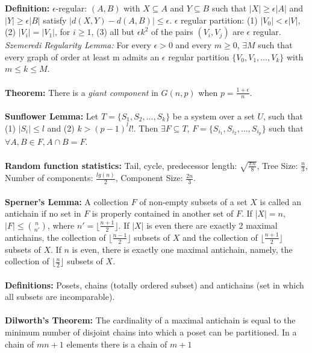 {\bf Definition:}
$\epsilon$-regular: $(A,B)$ with $X \subseteq A$ and $Y \subseteq B$ such that
$|X| \geq \epsilon |A|$ and
$|Y| \geq \epsilon |B|$ satisfy $|d(X,Y)-d(A,B)| \leq \epsilon$.
$\epsilon$ regular partition: (1) $| V_0 | < \epsilon |V|$, (2) $|V_i | = |
V_1 |$,
for $i \geq 1$, (3) all but $\epsilon k^2$ of the pairs $(V_i , V_j )$ are
$\epsilon$ regular.
\emph{Szemeredi Regularity Lemma:} For every $\epsilon >0$ and every $m \geq 0$,
$\exists M$ such that every graph of order at least m admits an $\epsilon$
regular partition $\{ V_0 , V_1 , \ldots , V_k \}$ with $m \leq k \leq M$.
\\
\\
{\bf Theorem:} There is a \emph{giant component} in $G(n,p)$ 
when $p={\frac {1+ \epsilon } {n}}$.\\
\\
{\bf Sunflower Lemma:} Let $T= \{ S_1 , S_2 , \ldots , S_k \}$ be a system over a
set $U$, such that (1) $| S_i | \leq l$ and (2) $k> {(p-1)}^l l!$.  Then
$\exists F \subseteq T$, $F= \{ S_{i_1} , S_{i_2} , \ldots ,
S_{i_p} \}$ such that $\forall A,B \in F,
A \cap B = F$.
\\
\\
{\bf Random function statistics:}
Tail, cycle, predecessor length: ${\sqrt {\frac {\pi n} {8}}}$,
Tree Size: ${\frac {n} {3}}$,
Number of components: ${\frac {lg(n)} {2}}$,
Component Size: ${\frac {2n} {3}}$.  \\
\\
{\bf Sperner's Lemma:}  A collection $F$ of non-empty subsets of a set $X$
is called an antichain
if no set in $F$ is properly contained in another set of $F$.  If $|X|=n$,
$|F| \leq {n \choose n'}$, where $n' = \lfloor {\frac {n+1} {2}} \rfloor$.
If $|X|$ is even there are exactly 2 maximal antichains,
the collection of $\lfloor {\frac {n-1} {2}} \rfloor$ subsets of $X$ and
the collection of $\lfloor {\frac {n+1} {2}} \rfloor$ subsets of $X$.
If $n$ is even, there is exactly one maximal antichain, namely, the
collection of $\lfloor {\frac {n} {2}} \rfloor$ subsets of $X$.
\\
\\
{\bf Definitions:}
Posets, chains (totally ordered subset) and antichains (set in which all
subsets are incomparable).
\\
\\
{\bf Dilworth's Theorem:} The cardinality of a maximal antichain
is equal to the minimum number of disjoint chains into which a poset can be
partitioned. In a chain of $mn+1$ elements there is a chain of $m+1$
